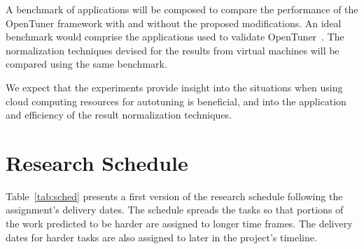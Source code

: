 \documentclass[a4paper, 12pt]{article}
\begin{document}
A benchmark of applications will be composed to compare the performance of the
OpenTuner framework with and without the proposed modifications.  An ideal
benchmark would comprise the applications used to validate
OpenTuner~\cite{ansel2014opentuner}.  The normalization techniques devised for
the results from virtual machines will be compared using the same benchmark.

We expect that the experiments provide insight into the situations when using
cloud computing resources for autotuning is beneficial, and into the
application and efficiency of the result normalization techniques.

\section{Research Schedule} \label{sec:sched}

Table~\ref{tab:sched} presents a first version of the research schedule
following the assignment's delivery dates.  The schedule spreads the tasks so
that portions of the work predicted to be harder are assigned to longer time
frames.  The delivery dates for harder tasks are also assigned to later in the
project's timeline.

\newcommand{\specialcell}[2][c]{%
  \begin{tabular}[#1]{@{}K@{}}#2\end{tabular}}
\end{document}
